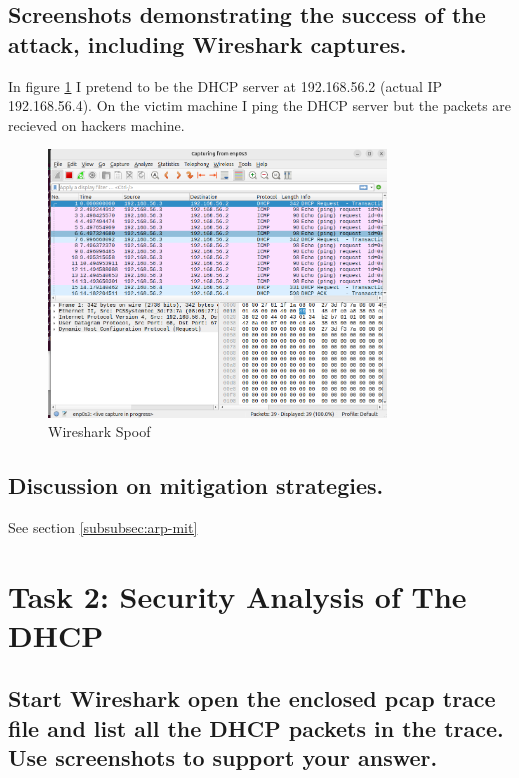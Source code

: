 \documentclass{article}
\begin{document}
\subsection*{Screenshots demonstrating the success of the attack, including Wireshark captures.}

In figure \ref{fig:wireshark-proof} I pretend to be the DHCP server at 192.168.56.2 (actual IP 192.168.56.4). On the victim machine I ping the DHCP server but the packets are recieved on hackers machine.

\begin{figure}[h]
    \centering
    \includegraphics[width=0.8\textwidth]{task1/screenshot/wireshark_spoof_proof.png}
    \caption{Wireshark Spoof}
    \label{fig:wireshark-proof}
\end{figure}

\subsection*{Discussion on mitigation strategies.}

See section \ref{subsubsec:arp-mit}

\newpage


\section{Task 2: Security Analysis of The DHCP}

\subsection{Start Wireshark open the enclosed pcap trace file and list all the DHCP packets in the trace. Use
screenshots to support your answer.}
\end{document}
